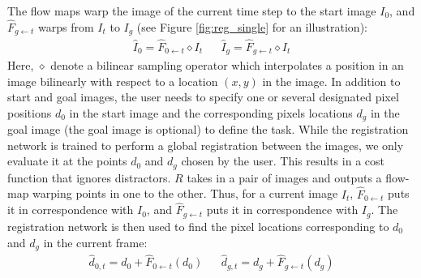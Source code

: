The flow maps warp the image of the current time step to the start image $I_0$, and $\hat{F}_{g \leftarrow t}$ warps from $I_t$ to $I_g$ (see Figure \ref{fig:reg_single} for an illustration):
\begin{align}
    \hat{I}_0 = \hat{F}_{0 \leftarrow t} \diamond  I_t &&
    \hat{I}_g = \hat{F}_{g \leftarrow t} \diamond  I_t 
\end{align}
Here, $\diamond$ denote a bilinear sampling operator which interpolates a position in an image bilinearly with respect to a location $(x,y)$ in the image. In addition to start and goal images, the user needs to specify one or several designated pixel positions $d_0$ in the start image and the corresponding pixels locations $d_g$ in the goal image (the goal image is optional) to define the task. While the registration network is trained to perform a global registration between the images, we only evaluate it at the points $d_0$ and $d_g$ chosen by the user. This results in a cost function that ignores distractors.  $R$ takes in a pair of images and outputs a flow-map warping points in one to the other. Thus, for a current image $I_t$, $\hat{F}_{0 \leftarrow t}$ puts it in correspondence with $I_0$, and $\hat{F}_{g \leftarrow t}$ puts it in correspondence with $I_g$. The registration network is then used to find the pixel locations corresponding to $d_0$ and $d_g$ in the current frame: 
\begin{align}
    \hat{d}_{0,t} = d_0 + \hat{F}_{0 \leftarrow t}(d_0) &&
    \hat{d}_{g,t} = d_g + \hat{F}_{g \leftarrow t}(d_g)
\end{align}
  

